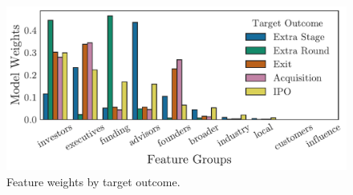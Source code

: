 ﻿\documentclass[../thesis/thesis.tex]{subfiles}
\begin{document}

\begin{figure}[!htb] %
    \centering
    \includegraphics[width=\textwidth]{../figures/evaluation/features_outcome}
    \caption[Feature weights by target outcome]{Feature weights by target outcome.}
    \label{fig:evaluation:feature_groups_outcome}
\end{figure}

\end{document}
